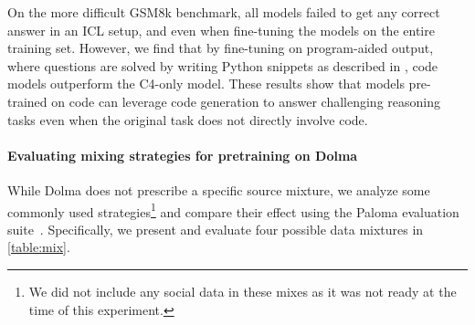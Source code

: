 \documentclass{article}
\newcommand{\dolma}{Dolma\xspace}
\begin{document}
On the more difficult GSM8k benchmark, all models failed to get any correct answer in an ICL setup, and even when fine-tuning the models on the entire training set. However, we find that by fine-tuning on program-aided output, where questions are solved by writing Python snippets as described in \cite{gao2022pal}, code models outperform the C4-only model. These results show that models pre-trained on code can leverage code generation to answer challenging reasoning tasks even when the original task does not directly involve code.

\paragraph{Evaluating mixing strategies for pretraining on \dolma}
While \dolma does not prescribe a specific source mixture, we analyze some commonly used strategies\footnote{
    We did not include any social data in these mixes as it was not ready at the time of this experiment.
} and compare their effect using the Paloma evaluation suite~\citep{paloma}.
Specifically, we present and evaluate four possible data mixtures in \autoref{table:mix}. 
\end{document}
